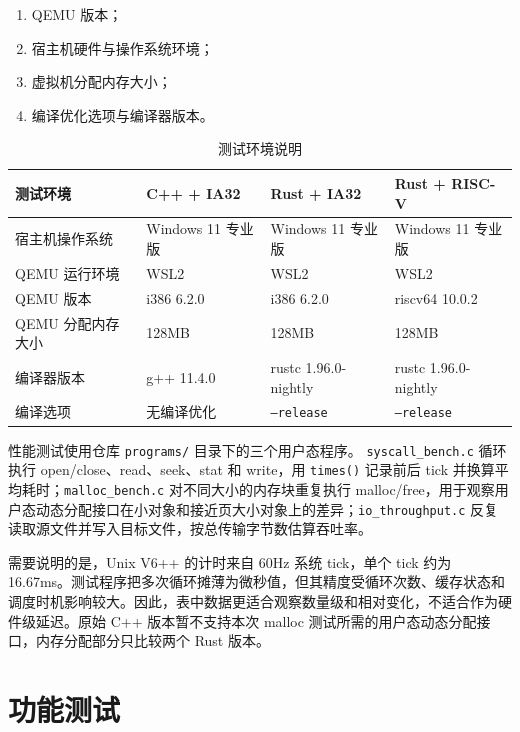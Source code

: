 \begin{enumerate}
  \item QEMU 版本；
  \item 宿主机硬件与操作系统环境；
  \item 虚拟机分配内存大小；
  \item 编译优化选项与编译器版本。
\end{enumerate}

\begin{table}[htbp]
  \centering
  \caption{测试环境说明}
  \begin{tabular}{p{}p{}p{}p{}}
    \toprule
    \textbf{测试环境} & \textbf{C++ + IA32} & \textbf{Rust + IA32} & \textbf{Rust + RISC-V} \\
    \midrule
    宿主机操作系统 & Windows 11 专业版 & Windows 11 专业版 & Windows 11 专业版 \\
    QEMU 运行环境 & WSL2 & WSL2 & WSL2 \\
    QEMU 版本 & i386 6.2.0 & i386 6.2.0 & riscv64 10.0.2 \\
    QEMU 分配内存大小 & 128MB & 128MB & 128MB \\
    编译器版本 & g++ 11.4.0 & rustc 1.96.0-nightly & rustc 1.96.0-nightly \\
    编译选项 & 无编译优化 & \texttt{--release} & \texttt{--release} \\
    \bottomrule
  \end{tabular}
\end{table}

性能测试使用仓库 \texttt{programs/} 目录下的三个用户态程序。 \texttt{syscall\_bench.c} 循环执行 open/close、read、seek、stat 和 write，用 \texttt{times()} 记录前后 tick 并换算平均耗时；\texttt{malloc\_bench.c} 对不同大小的内存块重复执行 malloc/free，用于观察用户态动态分配接口在小对象和接近页大小对象上的差异；\texttt{io\_throughput.c} 反复读取源文件并写入目标文件，按总传输字节数估算吞吐率。

需要说明的是，Unix V6++ 的计时来自 60Hz 系统 tick，单个 tick 约为 16.67ms。测试程序把多次循环摊薄为微秒值，但其精度受循环次数、缓存状态和调度时机影响较大。因此，表中数据更适合观察数量级和相对变化，不适合作为硬件级延迟。原始 C++ 版本暂不支持本次 malloc 测试所需的用户态动态分配接口，内存分配部分只比较两个 Rust 版本。

\section{功能测试}

